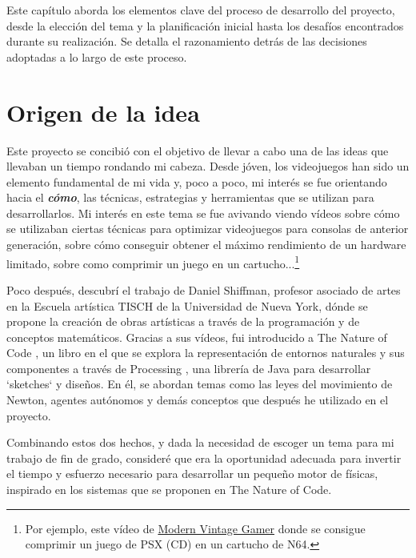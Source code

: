 
Este capítulo aborda los elementos clave del proceso de desarrollo del proyecto, desde la elección del tema y la planificación inicial hasta los desafíos encontrados durante su realización. Se detalla el razonamiento detrás de las decisiones adoptadas a lo largo de este proceso.

\section{Origen de la idea}
Este proyecto se concibió con el objetivo de llevar a cabo una de las ideas que llevaban un tiempo rondando mi cabeza. Desde jóven, los videojuegos han sido un elemento fundamental de mi vida y, poco a poco, mi interés se fue orientando hacia el \textbf{\textit{cómo}}, las técnicas, estrategias y herramientas que se utilizan para desarrollarlos. Mi interés en este tema se fue avivando viendo vídeos sobre cómo se utilizaban ciertas técnicas para optimizar videojuegos para consolas de anterior generación, sobre cómo conseguir obtener el máximo rendimiento de un hardware limitado, sobre como comprimir un juego en un cartucho...\footnote{Por ejemplo, este vídeo de \href{https://www.youtube.com/watch?v=BaX5YUZ5FLk}{Modern Vintage Gamer} donde se consigue comprimir un juego de PSX (CD) en un cartucho de N64.}

Poco después, descubrí el trabajo de Daniel Shiffman, profesor asociado de artes en la Escuela artística TISCH de la Universidad de Nueva York, dónde se propone la creación de obras artísticas a través de la programación y de conceptos matemáticos. Gracias a sus vídeos, fui introducido a The Nature of Code \cite{shiffman12}, un libro en el que se explora la representación de entornos naturales y sus componentes a través de Processing \cite{processing}, una librería de Java para desarrollar `sketches` y diseños. En él, se abordan temas como las leyes del movimiento de Newton, agentes autónomos y demás conceptos que después he utilizado en el proyecto. 

Combinando estos dos hechos, y dada la necesidad de escoger un tema para mi trabajo de fin de grado, consideré que era la oportunidad adecuada para invertir el tiempo y esfuerzo necesario para desarrollar un pequeño motor de físicas, inspirado en los sistemas que se proponen en The Nature of Code.


